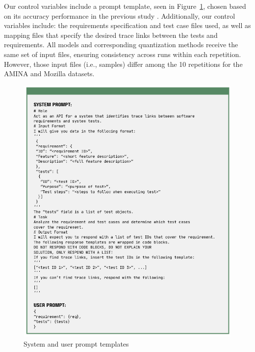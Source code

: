 \documentclass[conference]{IEEEtran}
\begin{document}
Our control variables include a prompt template, seen in Figure~\ref{fig:system_prompt}, chosen based on its accuracy performance in the previous study \cite{quinstedt2024Optimizing}. Additionally, our control variables include: the requirements specification and test case files used, as well as mapping files that specify the desired trace links between the tests and requirements. All models and corresponding quantization methods receive the same set of input files, ensuring consistency across runs within each repetition. However, those input files (i.e., samples) differ among the 10 repetitions for the AMINA and Mozilla datasets.

\begin{figure}
    \centering
    \includegraphics[width=\linewidth]{images/system_prompt}
    \caption{System and user prompt templates}
    \label{fig:system_prompt}
\end{figure}
\end{document}
